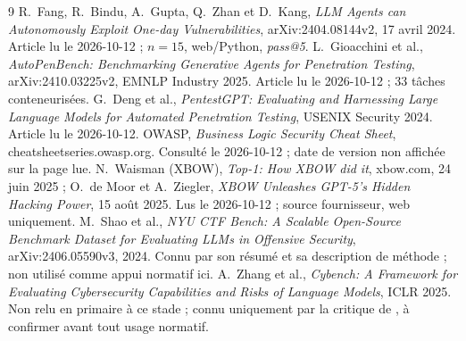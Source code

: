 \documentclass[11pt,a4paper]{article}
\begin{document}
\begin{thebibliography}{9}\small
{} R.~Fang, R.~Bindu, A.~Gupta, Q.~Zhan et D.~Kang, \emph{LLM Agents can Autonomously Exploit One-day Vulnerabilities}, arXiv:2404.08144v2, 17 avril 2024. Article lu le 2026-10-12 ; $n=15$, web/Python, \emph{pass@5}.
 L.~Gioacchini et al., \emph{AutoPenBench: Benchmarking Generative Agents for Penetration Testing}, arXiv:2410.03225v2, EMNLP Industry 2025. Article lu le 2026-10-12 ; 33 t\^aches conteneuris\'ees.
 G.~Deng et al., \emph{PentestGPT: Evaluating and Harnessing Large Language Models for Automated Penetration Testing}, USENIX Security 2024. Article lu le 2026-10-12.
 OWASP, \emph{Business Logic Security Cheat Sheet}, cheatsheetseries.owasp.org. Consult\'e le 2026-10-12 ; date de version non affich\'ee sur la page lue.
 N.~Waisman (XBOW), \emph{Top-1: How XBOW did it}, xbow.com, 24 juin 2025 ; O.~de Moor et A.~Ziegler, \emph{XBOW Unleashes GPT-5's Hidden Hacking Power}, 15 ao\^ut 2025. Lus le 2026-10-12 ; source fournisseur, web uniquement.
 M.~Shao et al., \emph{NYU CTF Bench: A Scalable Open-Source Benchmark Dataset for Evaluating LLMs in Offensive Security}, arXiv:2406.05590v3, 2024. Connu par son r\'esum\'e et sa description de m\'ethode ; non utilis\'e comme appui normatif ici.
 A.~Zhang et al., \emph{Cybench: A Framework for Evaluating Cybersecurity Capabilities and Risks of Language Models}, ICLR 2025. Non relu en primaire \`a ce stade ; connu uniquement par la critique de \cite{autopenbench}, \`a confirmer avant tout usage normatif.
\end{thebibliography}
\end{document}
